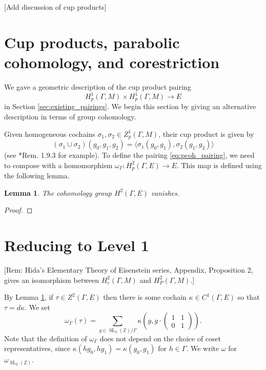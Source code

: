 \documentclass[10pt]{amsart}
\theoremstyle{plain}
\newtheorem{lemma}[theorem]{Lemma}
\theoremstyle{definition}
\newcommand{\ZZ}{{\mathbb{Z}}}
\DeclareMathOperator{\SL}{SL}
\begin{document}
[Add discussion of cup products]


\section{Cup products, parabolic cohomology, and corestriction}

We gave a geometric description of the cup product pairing
\begin{equation} \label{eq:pcoh_pairing}
H^1_p(\Gamma, M) \times H^1_p(\Gamma, M) \to E
\end{equation}
in Section \ref{sec:existing_pairings}.  We begin this section by giving an alternative description in terms of group cohomology.

Given homogeneous cochains $\sigma_1, \sigma_2 \in Z^1_p(\Gamma, M)$, their cup product is given by
\[
(\sigma_1 \cup \sigma_2)(g_0, g_1, g_2) = \langle \sigma_1(g_0, g_1), \sigma_2(g_1, g_2) \rangle
\]
(see \cite{Sharifi}*{Rem. 1.9.3} for example). To define the pairing \eqref{eq:pcoh_pairing}, we need to compose with a homomorphism $\omega_\Gamma : H^2_p(\Gamma, E) \to E$.  This map is defined using the following lemma.

\begin{lemma} \label{lem:H2E}
The cohomology group $H^2(\Gamma, E)$ vanishes.
\end{lemma}
\begin{proof}
\end{proof}

\section{Reducing to Level 1} \label{sec:level_one}
[Rem: Hida's Elementary Theory of Eisenstein series, Appendix, Proposition 2, gives an isomorphism between $H^2_c(\Gamma, M)$ and $H^2_P(\Gamma, M)$.]

By Lemma \ref{lem:H2E}, if $\tau \in Z^2(\Gamma, E)$ then there is some cochain $\kappa \in C^1(\Gamma, E)$ so that $\tau = d\kappa$.  We set
\[
\omega_\Gamma(\tau) = \sum_{g \in \SL_2(\ZZ) / \Gamma} \kappa\left(g, g \cdot \left(\begin{smallmatrix} 1 & 1 \\ 0 & 1 \end{smallmatrix}\right)\right).
\]
Note that the definition of $\omega_\Gamma$ does not depend on the choice of coset representatives, since $\kappa(hg_0, hg_1) = \kappa(g_0, g_1)$ for $h \in \Gamma$.  We write $\omega$ for $\omega_{\SL_2(\ZZ)}$.  
\end{document}
